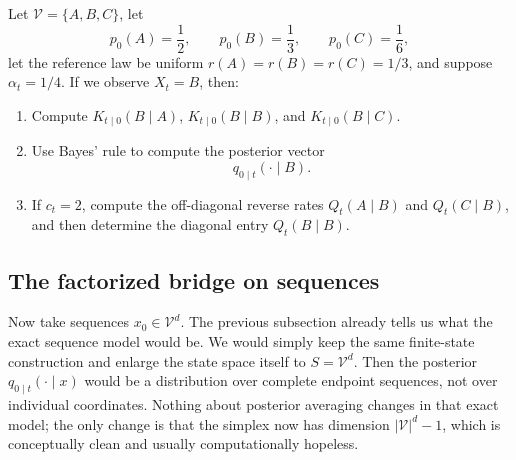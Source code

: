 \documentclass[11pt]{article}
\newif\ifshowsolutions
\newcommand{\SolutionBox}[2][10]{%
  \ifshowsolutions
    \begin{tcolorbox}[stat221panelgray,title={Solution}]
    #2
    \end{tcolorbox}
  \else
    \begin{tcolorbox}[stat221panelgray,unbreakable,title={Workspace}]
    \vspace{#1\baselineskip}
    \end{tcolorbox}
  \fi
}
\begin{document}
\begin{exercise}
\label{ex:tiny-vocab}
Let \(\mathcal{V}=\{A,B,C\}\), let
\[
  p_0(A)=\frac12,
  \qquad
  p_0(B)=\frac13,
  \qquad
  p_0(C)=\frac16,
\]
let the reference law be uniform \(r(A)=r(B)=r(C)=1/3\), and suppose \(\alpha_t=1/4\).
If we observe \(X_t=B\), then:
\begin{enumerate}[leftmargin=*]
  \item Compute \(K_{t\mid 0}(B\mid A)\), \(K_{t\mid 0}(B\mid B)\), and \(K_{t\mid 0}(B\mid C)\).
  \item Use Bayes' rule to compute the posterior vector
  \[
    q_{0\mid t}(\cdot\mid B).
  \]
  \item If \(c_t=2\), compute the off-diagonal reverse rates \(Q_t(A\mid B)\) and \(Q_t(C\mid B)\), and then determine the diagonal entry \(Q_t(B\mid B)\).
\end{enumerate}
\end{exercise}
\SolutionBox[14]{The one-token bridge is
\[
  K_{t\mid 0}(x\mid x_0)=\alpha_t\,\delta_{x_0}(x)+(1-\alpha_t)\,r(x).
\]
With \(\alpha_t=1/4\) and \(r(B)=1/3\),
\[
  K_{t\mid 0}(B\mid A)=\frac34\cdot \frac13=\frac14,
  \qquad
  K_{t\mid 0}(B\mid B)=\frac14+\frac34\cdot \frac13=\frac12,
  \qquad
  K_{t\mid 0}(B\mid C)=\frac14.
\]
The unnormalized posterior weights are therefore
\[
  p_0(A)K_{t\mid 0}(B\mid A)=\frac12\cdot\frac14=\frac18,
  \qquad
  p_0(B)K_{t\mid 0}(B\mid B)=\frac13\cdot\frac12=\frac16,
  \qquad
  p_0(C)K_{t\mid 0}(B\mid C)=\frac16\cdot\frac14=\frac1{24}.
\]
Their sum is
\[
  \frac18+\frac16+\frac1{24}=\frac13,
\]
so
\[
  q_{0\mid t}(A\mid B)=\frac{1/8}{1/3}=\frac38,
  \qquad
  q_{0\mid t}(B\mid B)=\frac{1/6}{1/3}=\frac12,
  \qquad
  q_{0\mid t}(C\mid B)=\frac{1/24}{1/3}=\frac18.
\]
Using \eqref{eq:full-state-rate} with \(c_t=2\),
\[
  Q_t(A\mid B)=2\cdot \frac38=\frac34,
  \qquad
  Q_t(C\mid B)=2\cdot \frac18=\frac14.
\]
The row sum must vanish, so
\[
  Q_t(B\mid B)=-\Bigl(Q_t(A\mid B)+Q_t(C\mid B)\Bigr)=-1.
\]}

\subsection{The factorized bridge on sequences}
\label{subsec:factorized-approximation}

Now take sequences \(x_0\in\mathcal{V}^d\).
The previous subsection already tells us what the exact sequence model would be.
We would simply keep the same finite-state construction and enlarge the state space itself to \(S=\mathcal{V}^d\).
Then the posterior \(q_{0\mid t}(\cdot\mid x)\) would be a distribution over complete endpoint sequences, not over individual coordinates.
Nothing about posterior averaging changes in that exact model; the only change is that the simplex now has dimension \(|\mathcal{V}|^d-1\), which is conceptually clean and usually computationally hopeless.
\end{document}

